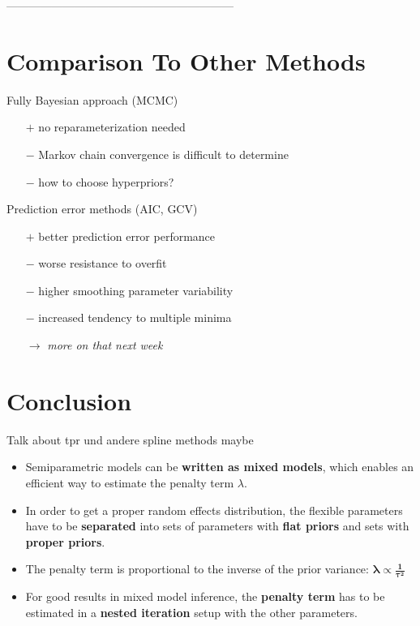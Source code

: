 \documentclass[12pt]{article}
\begin{document}
------------------------------------------------------------

\cite{fahrmeir2013regression}

\cite{kneib2006mixed}

\cite{wood2017generalized}

\cite{wood2011fast}


\section{Comparison To Other Methods} %


Fully Bayesian approach (MCMC)
\begin{itemize}
\item[$+$] no reparameterization needed
\item[$-$] Markov chain convergence is difficult to determine
\item[$-$] how to choose hyperpriors?
\end{itemize}

Prediction error methods (AIC, GCV)
\begin{itemize}
\item[$+$] better prediction error performance 
\item[$-$] worse resistance to overfit
\item[$-$] higher smoothing parameter variability
\item[$-$] increased tendency to multiple minima
\item[$\rightarrow$] \textit{more on that next week}
\end{itemize}


\section{Conclusion} %
Talk about tpr und andere spline methods maybe

\begin{itemize}
\item Semiparametric models can be \textbf{written as mixed models}, which enables an efficient way to estimate the penalty term $\lambda$.
\item In order to get a proper random effects distribution, the flexible parameters have to be \textbf{separated} into sets of parameters with \textbf{flat priors} and sets with \textbf{proper priors}.
\item The penalty term  is proportional to the inverse of the prior variance: $\mathbf{\boldsymbol{\lambda} \boldsymbol{\propto} \frac{1}{\boldsymbol{\tau}^2}}$
\item For good results in mixed model inference, the \textbf{penalty term} has to be estimated in a \textbf{nested iteration} setup with the other parameters.
\end{itemize}


\newpage
\printbibliography
\end{document}
